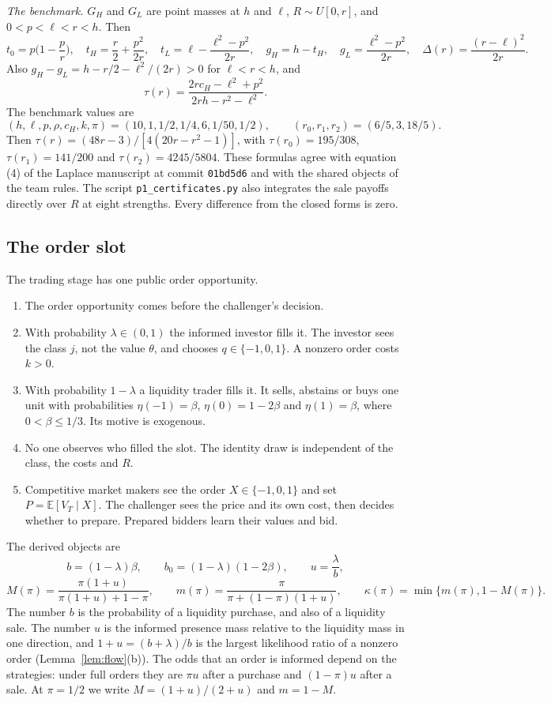 \documentclass[11pt]{article}
\theoremstyle{definition}
\newcommand{\E}{\mathbb E}
\begin{document}
\emph{The benchmark.} $G_H$ and $G_L$ are point masses at $h$ and $\ell$, $R\sim U[0,r]$, and $0<p<\ell<r<h$. Then
\[
t_0=p\Big(1-\frac pr\Big),\quad t_H=\frac r2+\frac{p^2}{2r},\quad t_L=\ell-\frac{\ell^2-p^2}{2r},\quad
g_H=h-t_H,\quad g_L=\frac{\ell^2-p^2}{2r},\quad \Delta(r)=\frac{(r-\ell)^2}{2r}.
\]
Also $g_H-g_L=h-r/2-\ell^2/(2r)>0$ for $\ell<r<h$, and
\[
\tau(r)=\frac{2rc_H-\ell^2+p^2}{2rh-r^2-\ell^2}.
\]
The benchmark values are
\[
(h,\ell,p,\rho,c_H,k,\pi)=(10,1,1/2,1/4,6,1/50,1/2),\qquad (r_0,r_1,r_2)=(6/5,3,18/5).
\]
Then $\tau(r)=(48r-3)/[4(20r-r^2-1)]$, with $\tau(r_0)=195/308$, $\tau(r_1)=141/200$ and $\tau(r_2)=4245/5804$.
These formulas agree with equation (4) of the Laplace manuscript at commit \texttt{01bd5d6} and with the
shared objects of the team rules. The script \texttt{p1\_certificates.py} also integrates the sale payoffs
directly over $R$ at eight strengths. Every difference from the closed forms is zero.

\subsection{The order slot}

The trading stage has one public order opportunity.
\begin{enumerate}
\item The order opportunity comes before the challenger's decision.
\item With probability $\lambda\in(0,1)$ the informed investor fills it. The investor sees the class $j$, not
  the value $\theta$, and chooses $q\in\{-1,0,1\}$. A nonzero order costs $k>0$.
\item With probability $1-\lambda$ a liquidity trader fills it. It sells, abstains or buys one unit with
  probabilities $\eta(-1)=\beta$, $\eta(0)=1-2\beta$ and $\eta(1)=\beta$, where $0<\beta\le 1/3$. Its motive is exogenous.
\item No one observes who filled the slot. The identity draw is independent of the class, the costs and $R$.
\item Competitive market makers see the order $X\in\{-1,0,1\}$ and set $P=\E[V_T\mid X]$. The challenger sees
  the price and its own cost, then decides whether to prepare. Prepared bidders learn their values and bid.
\end{enumerate}
The derived objects are
\[
b=(1-\lambda)\beta,\qquad b_0=(1-\lambda)(1-2\beta),\qquad u=\frac{\lambda}{b},
\]
\[
M(\pi)=\frac{\pi(1+u)}{\pi(1+u)+1-\pi},\qquad m(\pi)=\frac{\pi}{\pi+(1-\pi)(1+u)},\qquad
\kappa(\pi)=\min\{m(\pi),1-M(\pi)\}.
\]
The number $b$ is the probability of a liquidity purchase, and also of a liquidity sale. The number $u$ is the
informed presence mass relative to the liquidity mass in one direction, and $1+u=(b+\lambda)/b$ is the largest
likelihood ratio of a nonzero order (Lemma~\ref{lem:flow}(b)). The odds that an order is informed depend on the
strategies: under full orders they are $\pi u$ after a purchase and $(1-\pi)u$ after a sale. At $\pi=1/2$ we write
$M=(1+u)/(2+u)$ and $m=1-M$.
\end{document}
